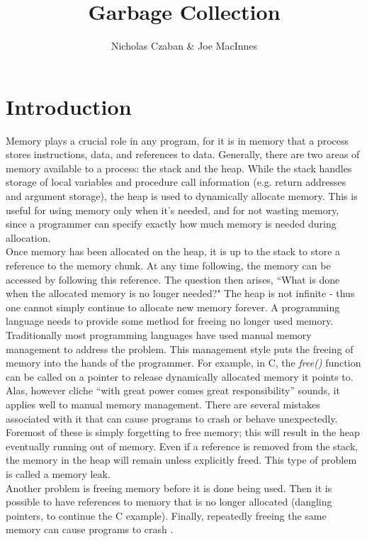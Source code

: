 \documentclass[12pt]{article}
\begin{document}
\title{Garbage Collection}
\author{Nicholas Czaban \& Joe MacInnes}
\maketitle
\section{Introduction}
Memory plays a crucial role in any program, for it is in memory that a process stores instructions, data, and references to data. Generally, there are two areas of memory available to a process: the stack and the heap. While the stack handles storage of local variables and procedure call information (e.g. return addresses and argument storage), the heap is used to dynamically allocate memory. This is useful for using memory only when it's needed, and for not wasting memory, since a programmer can specify exactly how much memory is needed during allocation.\\

Once memory has been allocated on the heap, it is up to the stack to store a reference to the memory chunk. At any time following, the memory can be accessed by following this reference. The question then arises, ``What is done when the allocated memory is no longer needed?" The heap is not infinite - thus one cannot simply continue to allocate new memory forever. A programming language needs to provide some method for freeing no longer used memory.\\

Traditionally most programming languages have used manual memory management to address the problem. This management style puts the freeing of memory into the hands of the programmer. For example, in C, the \textit{free()} function can be called on a pointer to release dynamically allocated memory it points to.\\

Alas, however cliche ``with great power comes great responsibility'' sounds, it applies well to manual memory management. There are several mistakes associated with it that can cause programs to crash or behave unexpectedly. Foremost of these is simply forgetting to free memory; this will result in the heap eventually running out of memory. Even if a reference is removed from the stack, the memory in the heap will remain unless explicitly freed. This type of problem is called a memory leak.\\

Another problem is freeing memory before it is done being used. Then it is possible to have references to memory that is no longer allocated (dangling pointers, to continue the C example). Finally, repeatedly freeing the same memory can cause programs to crash \cite{os_textbook}.\\
\end{document}
